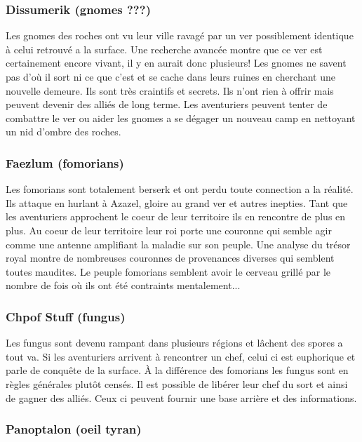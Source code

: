 \subsubsection*{Dissumerik (gnomes ???)}

Les gnomes des roches ont vu leur ville ravagé par un ver possiblement identique à celui retrouvé a la surface. Une recherche avancée montre que ce ver est certainement encore vivant, il y en aurait donc plusieurs! Les gnomes ne savent pas d'où il sort ni ce que c'est et se cache dans leurs ruines en cherchant une nouvelle demeure. Ils sont très craintifs et secrets. Ils n'ont rien à offrir mais peuvent devenir des alliés de long terme. Les aventuriers peuvent tenter de combattre le ver ou aider les gnomes a se dégager un nouveau camp en nettoyant un nid d'ombre des roches.

\subsubsection*{Faezlum (fomorians)}

Les fomorians sont totalement berserk et ont perdu toute connection a la réalité. Ils attaque en hurlant à Azazel, gloire au grand ver et autres inepties. Tant que les aventuriers approchent le coeur de leur territoire ils en rencontre de plus en plus. Au coeur de leur territoire leur roi porte une couronne qui semble agir comme une antenne amplifiant la maladie sur son peuple. Une analyse du trésor royal montre de nombreuses couronnes de provenances diverses qui semblent toutes maudites. Le peuple fomorians semblent avoir le cerveau grillé par le nombre de fois où ils ont été contraints mentalement...

\subsubsection*{Chpof Stuff (fungus)}

Les fungus sont devenu rampant dans plusieurs régions et lâchent des spores a tout va. Si les aventuriers arrivent à rencontrer un chef, celui ci est euphorique et parle de conquête de la surface. À la différence des fomorians les fungus sont en règles générales plutôt censés. Il est possible de libérer leur chef du sort et ainsi de gagner des alliés. Ceux ci peuvent fournir une base arrière et des informations.

\subsubsection*{Panoptalon (oeil tyran)}


